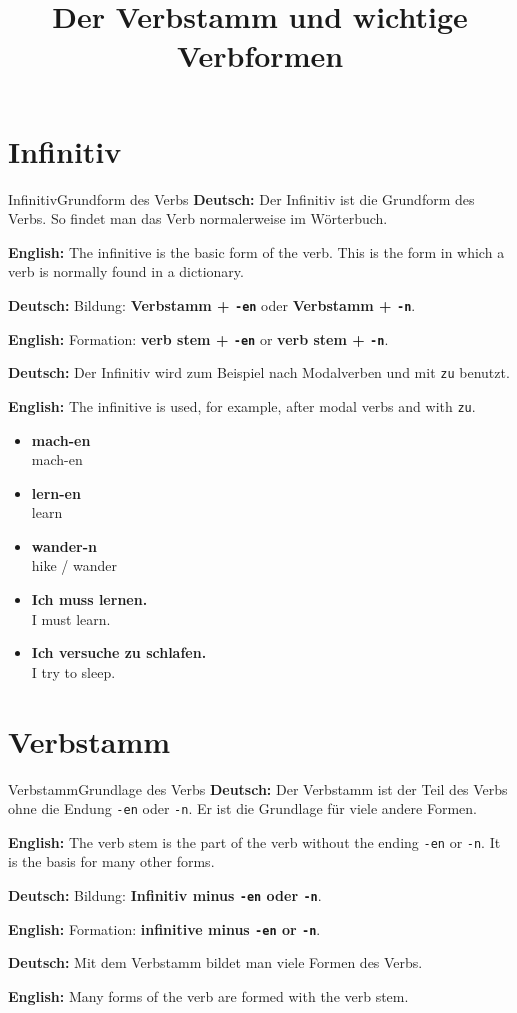 \documentclass[a4paper,11pt]{article}
\title{Der Verbstamm und wichtige Verbformen}
\date{}
\newcommand{\GermanText}[1]{\textbf{Deutsch: }#1\par}
\newcommand{\EnglishText}[1]{{\small\color{SoftGray}\textbf{English: }#1\par}}
\newcommand{\ExampleItem}[2]{\item \textbf{#1}\\{\small\color{SoftGray}#2}}
\begin{document}
    \maketitle
    \tableofcontents
    \newpage

    \section{Infinitiv}

        \begin{grammarentry}{Infinitiv}{Grundform des Verbs}
            \GermanText{Der Infinitiv ist die Grundform des Verbs. So findet man das Verb normalerweise im Wörterbuch.}
            \EnglishText{The infinitive is the basic form of the verb. This is the form in which a verb is normally found in a dictionary.}

            \GermanText{Bildung: \textbf{Verbstamm + \texttt{-en}} oder \textbf{Verbstamm + \texttt{-n}}.}
            \EnglishText{Formation: \textbf{verb stem + \texttt{-en}} or \textbf{verb stem + \texttt{-n}}.}

            \GermanText{Der Infinitiv wird zum Beispiel nach Modalverben und mit \texttt{zu} benutzt.}
            \EnglishText{The infinitive is used, for example, after modal verbs and with \texttt{zu}.}
        \end{grammarentry}

        \begin{exbox}
            \begin{itemize}
                \ExampleItem{mach-en}{mach-en}
                \ExampleItem{lern-en}{learn}
                \ExampleItem{wander-n}{hike / wander}
                \ExampleItem{Ich muss lernen.}{I must learn.}
                \ExampleItem{Ich versuche zu schlafen.}{I try to sleep.}
            \end{itemize}
        \end{exbox}

    \section{Verbstamm}

        \begin{grammarentry}{Verbstamm}{Grundlage des Verbs}
            \GermanText{Der Verbstamm ist der Teil des Verbs ohne die Endung \texttt{-en} oder \texttt{-n}. Er ist die Grundlage für viele andere Formen.}
            \EnglishText{The verb stem is the part of the verb without the ending \texttt{-en} or \texttt{-n}. It is the basis for many other forms.}

            \GermanText{Bildung: \textbf{Infinitiv minus \texttt{-en} oder \texttt{-n}}.}
            \EnglishText{Formation: \textbf{infinitive minus \texttt{-en} or \texttt{-n}}.}

            \GermanText{Mit dem Verbstamm bildet man viele Formen des Verbs.}
            \EnglishText{Many forms of the verb are formed with the verb stem.}
        \end{grammarentry}
\end{document}
